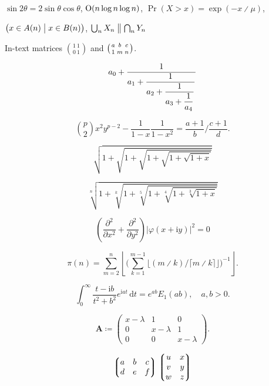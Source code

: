 	\noindent $\sin2\theta=2\sin\theta\cos\theta$, \quad
	$\hbox{O}(n\log n\log n)$, \quad
	$\Pr(X>x)=\exp(-x \divslash \mu)$,

	\noindent $\bigl(x\in A(n)\bigm|x\in B(n)\bigr)$, \quad
	$\bigcup_n X_n\bigm\|\bigcap_n Y_n$


	\noindent In-text matrices $\binom{1\ 1}{0\ 1}$ and $\bigl(\genfrac{}{}{0pt}{}{a}{1}\genfrac{}{}{0pt}{}{b}{m}\genfrac{}{}{0pt}{}{c}{n}\bigr)$.


	$$a_0+\frac1{\displaystyle a_1 +
		{\strut \frac1{\displaystyle a_2 +
				{\strut \frac1{\displaystyle a_3 +
						{\strut \frac1{\displaystyle a_4}}}}}}}$$


	$$\binom{p}{2}x^2y^{p-2} - \frac1{1 - x}\frac{1}{1 - x^2}
	=
	\frac{a+1}{b}\bigg/\frac{c+1}{d}.$$


	$$\sqrt{1+\sqrt{1+\sqrt{1+\sqrt{1+\sqrt{1+x}}}}}$$

	$$\sqrt[n]{1+\sqrt[k]{1+\sqrt[5]{1+\sqrt[4]{1+\sqrt[3]{1+x}}}}}$$


	$$\left(\frac{\partial^2}{\partial x^2} + \frac{\partial^2}{\partial y^2}\right)
	\bigl|\varphi(x+\mathup{i}y)\bigr|^2=0$$



	$$\pi(n)=\sum_{m=2}^n\left\lfloor\Biggl(\sum_{k=1}^{m-1}\bigl
	\lfloor(m \divslash k) \big/ \lceil m \divslash k\rceil\bigr\rfloor\Biggr)^{-1}\right\rfloor.$$


	$$\int_0^\infty \frac{t - \mathup{i} b}{t^2 + b^2}e^{\mathup{i}at}\,\mathup{d}t=e^{ab}E_1(ab), \quad
	a,b > 0.$$


	$$\mathbf{A} \coloneq \begin{pmatrix}x-\lambda&1&0\\
	0&x-\lambda&1\\
	0&0&x-\lambda\end{pmatrix}.$$

	$$\left\lgroup\begin{matrix}a&b&c\\ d&e&f\\\end{matrix}\right\rgroup
	\left\lgroup\begin{matrix}u&x\cr v&y\cr w&z\end{matrix}\right\rgroup$$

